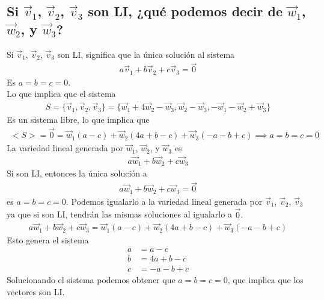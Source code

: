 \documentclass{article}
\begin{document}
\subsection{Si $\vec{v}_{1}$, $\vec{v}_{2}$, $\vec{v}_{3}$ son LI, ¿qué podemos decir de $\vec{w}_{1}$, $\vec{w}_{2}$, y $\vec{w}_{3}$?}
Si $\vec{v}_{1}$, $\vec{v}_{2}$, $\vec{v}_{3}$ son LI, significa que la única solución al sistema
\begin{equation}
    \begin{split}
        a \vec{v}_{1} + b \vec{v}_{2} + c \vec{v}_{3} = \vec{0}
    \end{split}
\end{equation}
Es $a=b=c=0$.\\
Lo que implica que el sistema
\begin{equation}
    \begin{split}
        S = \{ \vec{v}_{1}, \vec{v}_{2}, \vec{v}_{3} \} 
        = \{ \vec{w}_{1}+4 \vec{w}_{2}- \vec{w}_{3}, \vec{w}_{2} - \vec{w}_{3}, -\vec{w}_{1} - \vec{w}_{2} + \vec{w}_{3} \}
    \end{split}
\end{equation}
Es un sistema libre, lo que implica que
\begin{equation}
    \begin{split}
        <S> = \vec{0} = \vec{w}_{1}(a-c) +\vec{w}_{2}(4a+b-c) +\vec{w}_{3} (-a-b+c) \implies a=b=c=0
    \end{split}
\end{equation}
La variedad lineal generada por $\vec{w}_{1}$, $\vec{w}_{2}$, y $\vec{w}_{3}$ es
\begin{equation}
    \begin{split}
        a \vec{w}_{1} + b \vec{w}_{2} + c \vec{w}_{3}
    \end{split}
\end{equation}
Si son LI, entonces la única solución a
\begin{equation}
    \begin{split}
        a \vec{w}_{1} + b \vec{w}_{2} + c \vec{w}_{3} = \vec{0}
    \end{split}
\end{equation}
es $a=b=c=0$. Podemos igualarlo a la variedad lineal generada por $\vec{v}_{1}$, $\vec{v}_{2}$, $\vec{v}_{3}$ ya que
si son LI, tendrán las mismas soluciones al igualarlo a $\vec{0}$.
\begin{equation}
    \begin{split}
        a \vec{w}_{1} + b \vec{w}_{2} + c \vec{w}_{3} = \vec{w}_{1}(a-c) +\vec{w}_{2}(4a+b-c) +\vec{w}_{3} (-a-b+c)
    \end{split}
\end{equation}
Esto genera el sistema
\begin{equation}
    \begin{split}
        a&=a-c\\
        b &= 4a+b-c\\
        c &= -a-b+c
    \end{split}
\end{equation}
Solucionando el sistema podemos obtener que $a=b=c=0$, que implica que los vectores son LI.
\pagebreak
\end{document}

